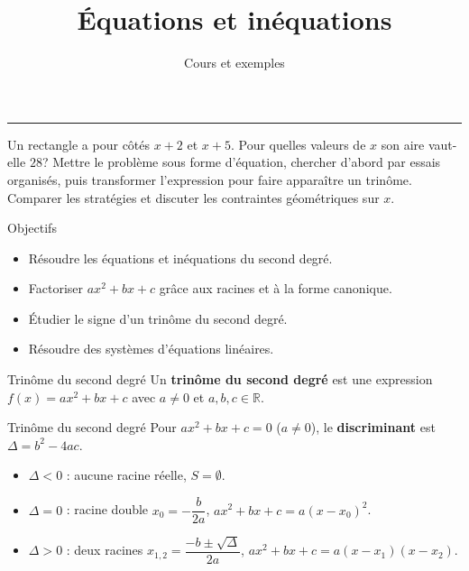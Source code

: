 \documentclass[aspectratio=169,10pt]{beamer}
\title{Équations et inéquations}
\subtitle{Cours et exemples}
\date{}
\author{}
\begin{document}
\begin{frame}[plain]
\vfill
{\inserttitle\par}
\medskip
{\insertsubtitle\par}
\medskip
{\rule{\textwidth}{.5pt}}
\vfill
\end{frame}
\begin{frame}{}
Un rectangle a pour côtés \(x+2\) et \(x+5\). Pour quelles valeurs de \(x\) son aire
vaut-elle \(28\)? Mettre le problème sous forme d'équation, chercher d'abord par
essais organisés, puis transformer l'expression pour faire apparaître un trinôme.
Comparer les stratégies et discuter les contraintes géométriques sur \(x\).
\end{frame}
\begin{frame}{Objectifs}
\begin{itemize}

  \item Résoudre les équations et inéquations du second degré.
  
\item Factoriser \(ax^2+bx+c\) grâce aux racines et à la forme canonique.
  
\item Étudier le signe d'un trinôme du second degré.
  
\item Résoudre des systèmes d'équations linéaires.

\end{itemize}
\end{frame}
\begin{frame}{Trinôme du second degré}
Un \textbf{trinôme du second degré} est une expression \(f(x) = ax^2+bx+c\)
avec \(a \ne 0\) et \(a,b,c \in \mathbb{R}\).
\end{frame}
\begin{frame}{Trinôme du second degré}
Pour \(ax^2+bx+c=0\) (\(a \ne 0\)), le \textbf{discriminant} est \(\Delta = b^2-4ac\).

\begin{itemize}

  \item \(\Delta < 0\) : aucune racine réelle, \(S = \emptyset\).
  
\item \(\Delta = 0\) : racine double \(x_0 = -\dfrac{b}{2a}\), 
        \(ax^2+bx+c = a(x-x_0)^2\).
  
\item \(\Delta > 0\) : deux racines
        \(x_{1,2} = \dfrac{-b \pm \sqrt{\Delta}}{2a}\), 
        \(ax^2+bx+c = a(x-x_1)(x-x_2)\).

\end{itemize}
\end{frame}
\end{document}
